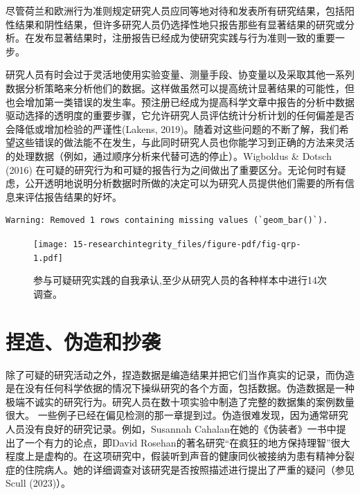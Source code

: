 \documentclass[
  letterpaper,
  DIV=11,
  numbers=noendperiod]{scrreprt}
\begin{document}
尽管荷兰和欧洲行为准则规定研究人员应同等地对待和发表所有研究结果，包括阳性结果和阴性结果，但许多研究人员仍选择性地只报告那些有显著结果的研究或分析。在发布显著结果时，注册报告已经成为使研究实践与行为准则一致的重要一步。

研究人员有时会过于灵活地使用实验变量、测量手段、协变量以及采取其他一系列数据分析策略来分析他们的数据。这样做虽然可以提高统计显著结果的可能性，但也会增加第一类错误的发生率。预注册已经成为提高科学文章中报告的分析中数据驱动选择的透明度的重要步骤，它允许研究人员评估统计分析计划的任何偏差是否会降低或增加检验的严谨性(Lakens,
2019)。随着对这些问题的不断了解，我们希望这些错误的做法能不在发生，与此同时研究人员也你能学习到正确的方法来灵活的处理数据（例如，通过顺序分析来代替可选的停止）。Wigboldus
\& Dotsch (2016)
在可疑的研究行为和可疑的报告行为之间做出了重要区分。无论何时有疑虑，公开透明地说明分析数据时所做的决定可以为研究人员提供他们需要的所有信息来评估报告结果的好坏。

\begin{verbatim}
Warning: Removed 1 rows containing missing values (`geom_bar()`).
\end{verbatim}

\begin{figure}

{\centering \texttt{[image: 15-researchintegrity\_files/figure-pdf/fig-qrp-1.pdf]}

}

\caption{\label{fig-qrp}参与可疑研究实践的自我承认,至少从研究人员的各种样本中进行14次调查。}

\end{figure}

\hypertarget{ux634fux9020ux4f2aux9020ux548cux6284ux88ad}{%
\section{捏造、伪造和抄袭}\label{ux634fux9020ux4f2aux9020ux548cux6284ux88ad}}

除了可疑的研究活动之外，捏造数据是编造结果并把它们当作真实的记录，而伪造是在没有任何科学依据的情况下操纵研究的各个方面，包括数据。伪造数据是一种极端不诚实的研究行为。研究人员在数十项实验中制造了完整的数据集的案例数量很大。
一些例子已经在偏见检测的那一章提到过。伪造很难发现，因为通常研究人员没有良好的研究记录。例如，Susannah
Cahalan在她的《伪装者》一书中提出了一个有力的论点，即David
Rosehan的著名研究``在疯狂的地方保持理智''很大程度上是虚构的。在这项研究中，假装听到声音的健康同伙被接纳为患有精神分裂症的住院病人。她的详细调查对该研究是否按照描述进行提出了严重的疑问（参见
Scull (2023)）。
\end{document}
